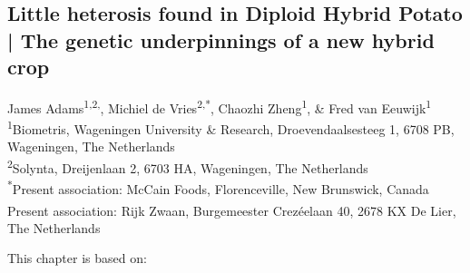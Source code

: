 \begin{refsection}

\chapter[Little heterosis found in Diploid Hybrid Potato | The genetic underpinnings of a new hybrid crop]{Little heterosis found in Diploid Hybrid Potato | The genetic underpinnings of a new hybrid crop}


\label{cha:chapter2}
\begin{center}
James Adams\textsuperscript{1,2,\textdagger},
Michiel de Vries\textsuperscript{2,*},
Chaozhi Zheng\textsuperscript{1}, \&
Fred van Eeuwijk\textsuperscript{1}\\[0.5em]
\small
\textsuperscript{1}Biometris, Wageningen University \& Research, Droevendaalsesteeg 1, 6708 PB, Wageningen, The Netherlands\\
\textsuperscript{2}Solynta, Dreijenlaan 2, 6703 HA, Wageningen, The Netherlands\\
\textsuperscript{*}Present association: McCain Foods, Florenceville, New Brunswick, Canada\\
\textsuperscript{\textdagger } Present association: Rijk Zwaan, Burgemeester Crezéelaan 40, 2678 KX De Lier, The Netherlands\\
\end{center}
\vspace{0.5em}

\vspace*{\fill}
This chapter is based on:
\\
\begin{quote}
\end{quote}

\\
\newpage


\end{refsection}

